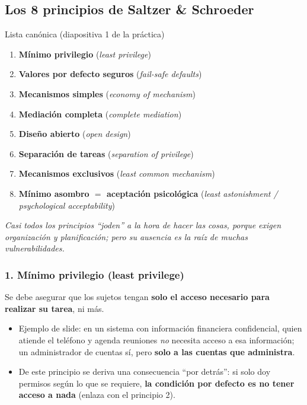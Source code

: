 \documentclass[11pt,a4paper]{article}
\begin{document}
\subsection{Los 8 principios de Saltzer \& Schroeder}

\begin{practbox}{Lista canónica (diapositiva 1 de la práctica)}
\begin{enumerate}[leftmargin=1.7em,itemsep=1pt]
  \item \textbf{Mínimo privilegio} (\emph{least privilege})
  \item \textbf{Valores por defecto seguros} (\emph{fail-safe defaults})
  \item \textbf{Mecanismos simples} (\emph{economy of mechanism})
  \item \textbf{Mediación completa} (\emph{complete mediation})
  \item \textbf{Diseño abierto} (\emph{open design})
  \item \textbf{Separación de tareas} (\emph{separation of privilege})
  \item \textbf{Mecanismos exclusivos} (\emph{least common mechanism})
  \item \textbf{Mínimo asombro $=$ aceptación psicológica} (\emph{least astonishment /
        psychological acceptability})
\end{enumerate}
\emph{Casi todos los principios ``joden'' a la hora de hacer las cosas, porque exigen
organización y planificación; pero su ausencia es la raíz de muchas vulnerabilidades.}
\end{practbox}

\subsubsection{1. Mínimo privilegio (least privilege)}
Se debe asegurar que los sujetos tengan \textbf{solo el acceso necesario para realizar su
tarea}, ni más.
\begin{itemize}[leftmargin=1.4em,itemsep=1pt]
  \item Ejemplo de slide: en un sistema con información financiera confidencial, quien atiende
        el teléfono y agenda reuniones \emph{no} necesita acceso a esa información; un
        administrador de cuentas sí, pero \textbf{solo a las cuentas que administra}.
  \item De este principio se deriva una consecuencia ``por detrás'': si solo doy permisos
        según lo que se requiere, \textbf{la condición por defecto es no tener acceso a nada}
        (enlaza con el principio 2).
\end{itemize}
\end{document}

